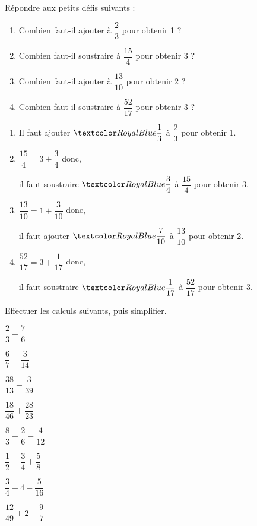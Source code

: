 \begin{Maquette}[Fiche,CorrigeFin,Colonnes=2]{}
\begin{multicols}{2}
      
      \begin{exercice} %
         Répondre aux petits défis suivants :
         \begin{enumerate}
            \item Combien faut-il ajouter à $\dfrac23$ pour obtenir 1 ? \smallskip
            \item Combien faut-il soustraire à $\dfrac{15}4$ pour obtenir 3 ? \smallskip
            \item Combien faut-il ajouter à $\dfrac{13}{10}$ pour obtenir 2 ? \smallskip
            \item Combien faut-il soustraire à $\dfrac{52}{17}$ pour obtenir 3 ?
         \end{enumerate}
      \end{exercice}
      
      \begin{Solution}
         \begin{enumerate}
            \item Il faut ajouter $\cor{\dfrac13}$ à $\dfrac23$ pour obtenir 1.
            \item $\dfrac{15}{4} =3+\dfrac34$ donc, \par
               il faut soustraire $\cor{\dfrac34}$ à $\dfrac{15}{4}$ pour obtenir 3.
            \item $\dfrac{13}{10} =1+\dfrac{3}{10}$ donc, \par
               il faut ajouter $\cor{\dfrac{7}{10}}$ à $\dfrac{13}{10}$ pour obtenir 2.
            \item $\dfrac{52}{17} =3+\dfrac{1}{17}$ donc, \par
               il faut soustraire $\cor{\dfrac{1}{17}}$ à $\dfrac{52}{17}$ pour obtenir 3.
         \end{enumerate}
      \end{Solution}
      
      
      \begin{exercice}[Dur] %
         Effectuer les calculs suivants, puis simplifier. \smallskip
         \begin{colenumerate}
            \item $\dfrac23+\dfrac76$ \smallskip
            \item $\dfrac67-\dfrac3{14}$ \smallskip
            \item $\dfrac{38}{13}-\dfrac3{39}$ \smallskip
            \item $\dfrac{18}{46}+\dfrac{28}{23}$ \smallskip
            \item $\dfrac83-\dfrac26-\dfrac4{12}$
            \item $\dfrac12+\dfrac34+\dfrac58$
            \item $\dfrac34-4-\dfrac5{16}$
            \item $\dfrac{12}{49}+2-\dfrac97$
         \end{colenumerate}
      \end{exercice}
      

\end{multicols}
\end{Maquette}
